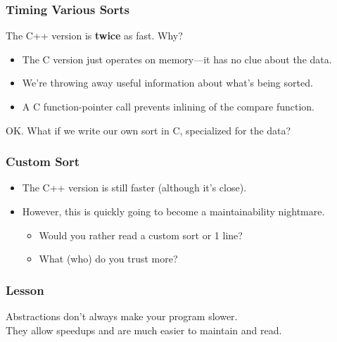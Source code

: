 \begin{frame}
  \frametitle{Timing Various Sorts}


     The C++ version is {\bf twice} as fast. Why?
      \begin{itemize}
        \item The C version just operates on memory---it has no clue about the
          data.
        \item We're throwing away useful information about what's being sorted.
        \item A C function-pointer call prevents inlining of the compare function.
      \end{itemize}
     OK. What if we write our own sort in C, specialized for the data?
  
\end{frame}

\begin{frame}
  \frametitle{Custom Sort}


  \begin{itemize}
    \item The C++ version is still faster (although it's close).
    \item However, this is quickly going to become a maintainability nightmare.
      \begin{itemize}
        \item Would you rather read a custom sort or 1 line?
        \item What (who) do you trust more?
      \end{itemize}
  \end{itemize}
  

\end{frame}

\begin{frame}
  \frametitle{Lesson}
  
\large
    Abstractions don't always make your program slower. \\[1em]

    They 
      allow speedups and are much easier to maintain and read.
  
\end{frame}

